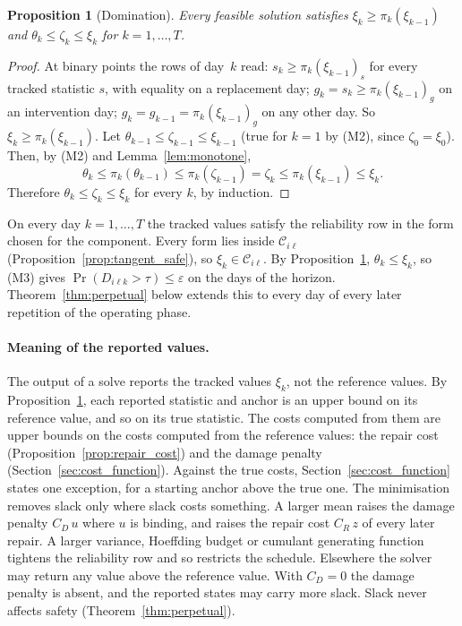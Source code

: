 \documentclass[11pt,a4paper]{article}
\theoremstyle{plain}
\newtheorem{proposition}[theorem]{Proposition}
\theoremstyle{definition}
\theoremstyle{remark}
\begin{document}
\begin{proposition}[Domination]\label{prop:domination}
Every feasible solution satisfies $\xi_k \ge \pi_k(\xi_{k-1})$ and $\theta_k \le \zeta_k \le \xi_k$ for $k = 1, \ldots, T$.
\end{proposition}
\begin{proof}
At binary points the rows of day~$k$ read: $s_k \ge \pi_k(\xi_{k-1})_s$ for every tracked statistic $s$, with equality on a replacement day; $g_k = s_k \ge \pi_k(\xi_{k-1})_g$ on an intervention day; $g_k = g_{k-1} = \pi_k(\xi_{k-1})_g$ on any other day.
So $\xi_k \ge \pi_k(\xi_{k-1})$.
Let $\theta_{k-1} \le \zeta_{k-1} \le \xi_{k-1}$ (true for $k = 1$ by (M2), since $\zeta_0 = \xi_0$).
Then, by (M2) and Lemma~\ref{lem:monotone},
\[
  \theta_k \le \pi_k(\theta_{k-1}) \le \pi_k(\zeta_{k-1}) = \zeta_k \le \pi_k(\xi_{k-1}) \le \xi_k .
\]
Therefore $\theta_k \le \zeta_k \le \xi_k$ for every $k$, by induction.
\end{proof}

On every day $k = 1, \ldots, T$ the tracked values satisfy the reliability row in the form chosen for the component.
Every form lies inside $\mathcal{C}_{i\ell}$ (Proposition~\ref{prop:tangent_safe}), so $\xi_k \in \mathcal{C}_{i\ell}$.
By Proposition~\ref{prop:domination}, $\theta_k \le \xi_k$, so (M3) gives $\Pr(D_{i\ell k} > \tau) \le \varepsilon$ on the days of the horizon.
Theorem~\ref{thm:perpetual} below extends this to every day of every later repetition of the operating phase.

\paragraph{Meaning of the reported values.}
The output of a solve reports the tracked values $\xi_k$, not the reference values.
By Proposition~\ref{prop:domination}, each reported statistic and anchor is an upper bound on its reference value, and so on its true statistic.
The costs computed from them are upper bounds on the costs computed from the reference values: the repair cost (Proposition~\ref{prop:repair_cost}) and the damage penalty (Section~\ref{sec:cost_function}).
Against the true costs, Section~\ref{sec:cost_function} states one exception, for a starting anchor above the true one.
The minimisation removes slack only where slack costs something.
A larger mean raises the damage penalty $C_D\,u$ where $u$ is binding, and raises the repair cost $C_R\,z$ of every later repair.
A larger variance, Hoeffding budget or cumulant generating function tightens the reliability row and so restricts the schedule.
Elsewhere the solver may return any value above the reference value.
With $C_D = 0$ the damage penalty is absent, and the reported states may carry more slack.
Slack never affects safety (Theorem~\ref{thm:perpetual}).
\end{document}
